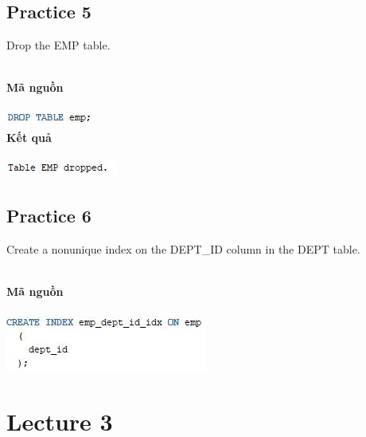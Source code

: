 \documentclass[12pt,a4paper]{report}
\begin{document}
\subsection{Practice 5}
\begin{boxedminipage}[t]{4.5cm}
	Drop the EMP table.
\end{boxedminipage}
\newline
\\
\textbf{Mã nguồn}\\\\
\includegraphics[scale=1]{p5.jpg}\\
\textbf{Kết quả}\\\\
\includegraphics[scale=1]{kp5.jpg}

\subsection{Practice 6}
\begin{boxedminipage}[t]{14.5cm}
Create a nonunique index on the DEPT\_ID column in the DEPT table.
\end{boxedminipage}
\newline
\\
\textbf{Mã nguồn}\\\\
\includegraphics[scale=1]{p6.jpg}

\section{Lecture 3}
\end{document}
